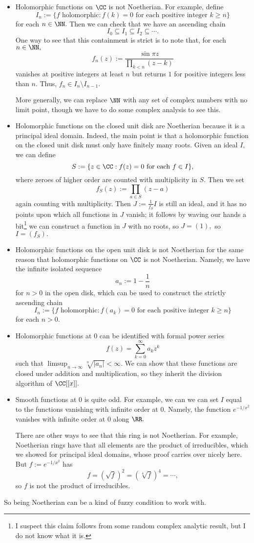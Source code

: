 \documentclass[../notes.tex]{subfiles}
\begin{document}
\begin{itemize}
	\item Holomorphic functions on $\CC$ is not Noetherian. For example, define
	\[I_n:=\{f\text{ holomorphic}:f(k)=0\text{ for each positive integer }k\ge n\}\]
	for each $n\in\NN.$ Then we can check that we have an ascending chain
	\[I_0\subseteq I_1\subseteq I_2\subseteq\cdots.\]
	One way to see that this containment is strict is to note that, for each $n\in\NN,$
	\[f_n(z):=\frac{\sin\pi z}{\prod_{k<n}(z-k)}\]
	vanishes at positive integers at least $n$ but returns $1$ for positive integers less than $n.$ Thus, $f_n\in I_n\setminus I_{n-1}.$
	
	More generally, we can replace $\NN$ with any set of complex numbers with no limit point, though we have to do some complex analysis to see this.
	\item Holomorphic functions on the closed unit disk are Noetherian because it is a principal ideal domain. Indeed, the main point is that a holomorphic function on the closed unit disk must only have finitely many roots. Given an ideal $I,$ we can define
	\[S:=\{z\in\CC:f(z)=0\text{ for each }f\in I\},\]
	where zeroes of higher order are counted with multiplicity in $S.$ Then we set
	\[f_S(z):=\prod_{a\in S}(z-a)\]
	again counting with multiplicity. Then $J:=\frac1{f_S}I$ is still an ideal, and it has no points upon which all functions in $J$ vanish; it follows by waving our hands a bit\footnote{I suspect this claim follows from some random complex analytic result, but I do not know what it is.} we can construct a function in $J$ with no roots, so $J=(1),$ so $I=(f_S).$
	\item Holomorphic functions on the open unit disk is not Noetherian for the same reason that holomorphic functions on $\CC$ is not Noetherian. Namely, we have the infinite isolated sequence
	\[a_n:=1-\frac1n\]
	for $n>0$ in the open disk, which can be used to construct the strictly ascending chain
	\[I_n:=\{f\text{ holomorphic}:f(a_k)=0\text{ for each positive integer }k\ge n\}\]
	for each $n>0.$
	\item Holomorphic functions at $0$ can be identified with formal power series
	\[f(z)=\sum_{k=0}^\infty a_kz^k\]
	such that $\limsup_{n\to\infty}\sqrt[n]{|a_n|}<\infty.$ We can show that these functions are closed under addition and multiplication, so they inherit the division algorithm of $\CC[[x]].$
	\item Smooth functions at $0$ is quite odd. For example, we can we can set $I$ equal to the functions vanishing with infinite order at $0.$ Namely, the function $e^{-1/x^2}$ vanishes with infinite order at $0$ along $\RR.$

	There are other ways to see that this ring is not Noetherian. For example, Noetherian rings have that all elements are the product of irreducibles, which we showed for principal ideal domains, whose proof carries over nicely here. But $f:=e^{-1/x^2}$ has
	\[f=\left(\sqrt f\right)^2=\left(\sqrt[4]f\right)^4=\cdots,\]
	so $f$ is not the product of irreducibles.
\end{itemize}
So being Noetherian can be a kind of fuzzy condition to work with.
\end{document}
